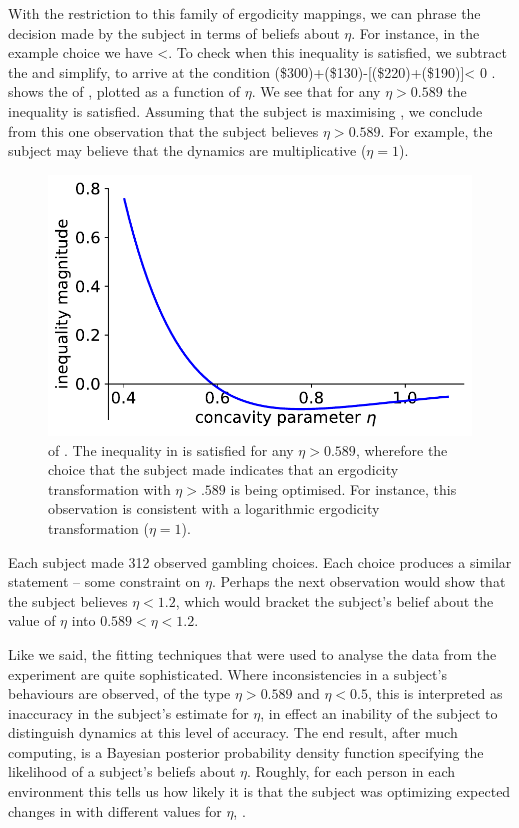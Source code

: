 With the restriction to this family of ergodicity mappings, we can phrase the decision 
made by the subject in terms of beliefs about $\eta$. For instance, in the example choice we have
\be
{}<.
\ee
To check when this inequality is satisfied, we subtract the \RHS and simplify, to arrive at
the condition
\be
\gv(\$300)+\gv(\$130)-[\gv(\$220)+\gv(\$190)]< 0 .
\ee
{} shows the \LHS of , plotted as a function of $\eta$.
We see that for any $\eta>0.589$ the inequality is satisfied. Assuming that the subject is 
maximising , we conclude from this one observation
that the subject believes $\eta>0.589$. For example, the subject may believe that the 
dynamics are multiplicative ($\eta=1$).
\begin{figure}
    \includegraphics[width=.5\textwidth]{./chapter_real/figs/eta_constraint.pdf}
    \caption{\LHS of . The inequality in  is 
    satisfied for any $\eta>0.589$, wherefore the choice that the subject made
    indicates that an ergodicity transformation with $\eta>.589$ is being optimised.
    For instance, this observation is consistent with a logarithmic ergodicity transformation ($\eta=1$).}
\end{figure}

Each subject made 312 observed gambling choices. Each choice produces a similar statement -- some
constraint on $\eta$. 
Perhaps the next observation would show that the subject believes $\eta<1.2$, which would 
bracket the subject's belief about the value of $\eta $ into $0.589<\eta<1.2$. 

Like we said, the fitting techniques that were used to analyse the data from the experiment 
are quite sophisticated. Where inconsistencies in a subject's behaviours are observed, 
\eg of the type $\eta>0.589$ and $\eta<0.5$, this is interpreted 
as inaccuracy in the subject's estimate for $\eta$, in effect an inability of the subject to 
distinguish dynamics at this level of accuracy. The end result, after much computing, is a 
Bayesian posterior probability density function specifying the likelihood of a subject's beliefs
about $\eta$. Roughly, for each person in each environment this tells us how likely it is that the 
subject was optimizing expected changes in  with different values for $\eta$, .

